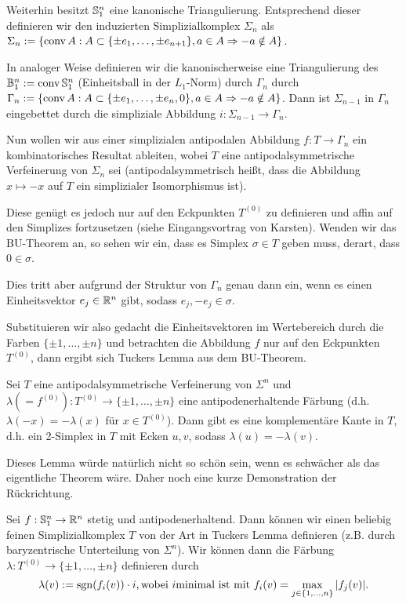 \message{ !name(OnBorsukUlamsThoerem.tex)}\documentclass[10pt,a4paper]{article}
\begin{document}
Weiterhin besitzt $\mathbb{S}^n_1$ eine kanonische Triangulierung. Entsprechend dieser definieren wir den induzierten Simplizialkomplex $\Sigma_n$ als $\Sigma_n:=\{\operatorname{conv} A: A\subset\{\pm e_1,\ldots,\pm e_{n+1}\}, a\in A\Rightarrow -a\notin A\}$.

In analoger Weise definieren wir die kanonischerweise eine Triangulierung des $\mathbb{B}^n_1:=\operatorname{conv}\mathbb{S}^n_1$ (Einheitsball in der $L_1$-Norm) durch $\Gamma_n$ durch $\Gamma_n:=\{\operatorname{conv} A: A\subset\{\pm e_1,\ldots,\pm e_n,0\}, a\in A\Rightarrow -a\notin A\}$.
Dann ist $\Sigma_{n-1}$ in $\Gamma_n$ eingebettet durch die simpliziale Abbildung $i:\Sigma_{n-1}\to\Gamma_n$.

Nun wollen wir aus einer simplizialen antipodalen Abbildung $f:T\to\Gamma_n$ ein kombinatorisches Resultat ableiten, wobei $T$ eine antipodalsymmetrische Verfeinerung von $\Sigma_n$ sei (antipodalsymmetrisch heißt, dass die Abbildung $x\mapsto -x$ auf $T$ ein simplizialer Isomorphismus ist).

Diese genügt es jedoch nur auf den Eckpunkten $T^{(0)}$ zu definieren und affin auf den Simplizes fortzusetzen (siehe Eingangsvortrag von Karsten). Wenden wir das BU-Theorem an, so sehen wir ein, dass es Simplex $\sigma\in T$ geben muss, derart, dass $0\in\sigma$. 

Dies tritt aber aufgrund der Struktur von $\Gamma_n$ genau dann ein, wenn es einen Einheitsvektor $e_j\in\mathbb{R}^n$ gibt, sodass $e_j,-e_j\in\sigma$. 

Substituieren wir also gedacht die Einheitsvektoren im Wertebereich durch die Farben $\{\pm1,\ldots,\pm n\}$ und betrachten die Abbildung $f$ nur auf den Eckpunkten $T^{(0)}$, dann ergibt sich Tuckers Lemma aus dem BU-Theorem.

\begin{lemma}[Tucker]
Sei $T$ eine antipodalsymmetrische Verfeinerung von $\Sigma^n$ und $\lambda(=f^{(0)}):T^{(0)}\to\{\pm1,\ldots,\pm n\}$ eine antipodenerhaltende Färbung (d.h. $\lambda(-x)=-\lambda(x)$ für $x\in T^{(0)}$). Dann gibt es eine komplementäre Kante in $T$, d.h. ein 2-Simplex in $T$ mit Ecken $u,v$, sodass $\lambda(u)=-\lambda(v)$. 
\end{lemma}

Dieses Lemma würde natürlich nicht so schön sein, wenn es schwächer als das eigentliche Theorem wäre.
Daher noch eine kurze Demonstration der Rückrichtung.

Sei $f:\mathbb{S}^n_1\rightarrow\mathbb{R}^n$ stetig und antipodenerhaltend. Dann können wir einen beliebig feinen Simplizialkomplex $T$ von der Art in Tuckers Lemma definieren (z.B. durch baryzentrische Unterteilung von $\Sigma^n$). Wir können dann die Färbung $\lambda:T^{(0)}\to \{\pm1,\ldots,\pm n\}$ definieren durch
\begin{equation}
\lambda(v):=\operatorname{sgn}(f_i(v))\cdot i, \text{wobei } i \text{minimal ist mit } f_i(v)=\max_{j\in\{1,\ldots,n\}}{|f_j(v)|}\text{.}
\end{equation}
\end{document}
